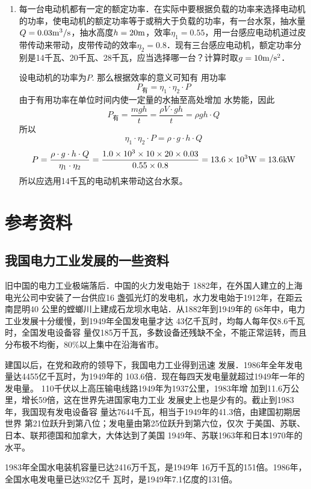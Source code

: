 \begin{enumerate}
    \item 每一台电动机都有一定的额定功率．在实际中要根据负载的功率来选择电动机的功率，使电动机的额定功率等于或稍大于负载的功率，有一台水泵，抽水量$Q=0.03{\rm m^3}/{\rm s}$，抽水高度$h=20{\rm m}$，效率$\eta_1=0.55$，用一台感应电动机道过皮带传动来带动，皮带传动的效率$\eta_2=0.8$．现有三台感应电动机，额定功率分别是14千瓦、20千瓦、28千瓦，应当选择哪一台？计算时取$g=10\text{m}/\text{s}^2$．

    \begin{solution}
设电动机的功率为$P$. 那么根据效率的意义可知有
用功率
\[P_{\text{有}}=\eta_1\cdot \eta_2\cdot P\]
由于有用功率在单位时间内使一定量的水抽至高处增加
水势能，因此
\[P_{\text{有}}=\frac{mgh}{t}=\frac{\rho V\cdot gh}{t}=\rho gh\cdot Q\]
所以
\[\eta_1\cdot \eta_2\cdot Ρ=\rho \cdot g\cdot h\cdot Q\]
\[P=\frac{\rho \cdot g\cdot h\cdot Q}{\eta_1\cdot \eta_2}=\frac{1.0\times 10^3\times 10\times 20\times 0.03}{0.55\times 0.8}=13.6\times 10^3{\rm W}=13.6{\rm kW}\]
所以应选用14千瓦的电动机来带动这台水泵。
    \end{solution}    
\end{enumerate}



\section{参考资料}
\subsection{我国电力工业发展的一些资料}

旧中国的电力工业极端落后．中国的火力发电始于
1882年，在外国人建立的上海电光公司中安装了一台供应16
盏弧光灯的发电机，水力发电始于1912年，在距云南昆明40
公里的螳螂川上建成石龙坝水电站．从1882年到1949年的
68年中，电力工业发展十分缓慢，到1949年全国发电量才达
43亿千瓦时，均每人每年仅8.6千瓦时，全国发电设备容
量仅185万千瓦，多数设备还残缺不全，不能正常运转，而且
分布极不均衡，80\%以上集中在沿海省市。

建国以后，在党和政府的领导下，我国电力工业得到迅速
发展．1986年全年发电量达4455亿千瓦时，为1949年的
103.6倍．现在每四天发电量就超过1949年一年的发电量。
110千伏以上高压输电线路1949年为1937公里，1983年增
加到11.6万公里，增长59倍，这在世界先进国家电力工业
发展史上也是少有的。截止到1983年，我国现有发电设备容
量达7644千瓦，相当于1949年的41.3倍，由建国初期居世界
第21位跃升到第八位；发电量由第25位跃升到第六位，仅次
于美国、苏联、日本、联邦德国和加拿大，大体达到了美国
1949年、苏联1963年和日本1970年的水平。

1983年全国水电装机容量已达2416万千瓦，是1949年
16万千瓦的151倍。1986年，全国水电发电量已达932亿千
瓦时，是1949年7.1亿度的131倍。

